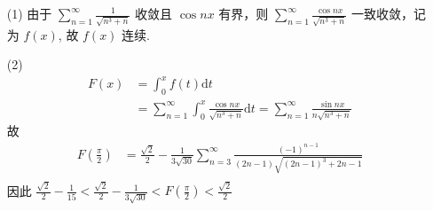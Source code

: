 \documentclass{article}
\begin{document}
\begin{itemize}
    \item [(1)] 由于 $\sum_{n = 1}^{\infty}\frac{1}{\sqrt{n^3 + n}}$ 收敛且 $\cos nx$ 有界，则 $\sum_{n = 1}^{\infty}\frac{\cos nx}{\sqrt{n^3 + n}}$ 一致收敛，记为 $f(x)$, 故 $f(x)$ 连续.
    \item [(2)] \begin{align*}
        F(x) &= \int_{0}^{x}f(t)\mathrm{d}t \\
        &= \sum_{n = 1}^{\infty}\int_{0}^{x}\frac{\cos nx}{\sqrt{n^3 + n}}\mathrm{d}t = \sum_{n = 1}^{\infty}\frac{\sin nx}{n \sqrt{n^3 + n}}
    \end{align*}
    故 
    \begin{align*}
        F\left(\frac{\pi}{2}\right) &= \frac{\sqrt{2}}{2} - \frac{1}{3\sqrt{30}} \sum_{n = 3}^{\infty}\frac{(-1)^{n - 1}}{(2n - 1)\sqrt{(2n - 1)^3 + 2n - 1}} \\
    \end{align*}
    因此 $\frac{\sqrt{2}}{2} - \frac{1}{15} < \frac{\sqrt{2}}{2} - \frac{1}{3\sqrt{30}} < F\left(\frac{\pi}{2}\right) < \frac{\sqrt{2}}{2}$
\end{itemize}
\end{document}
